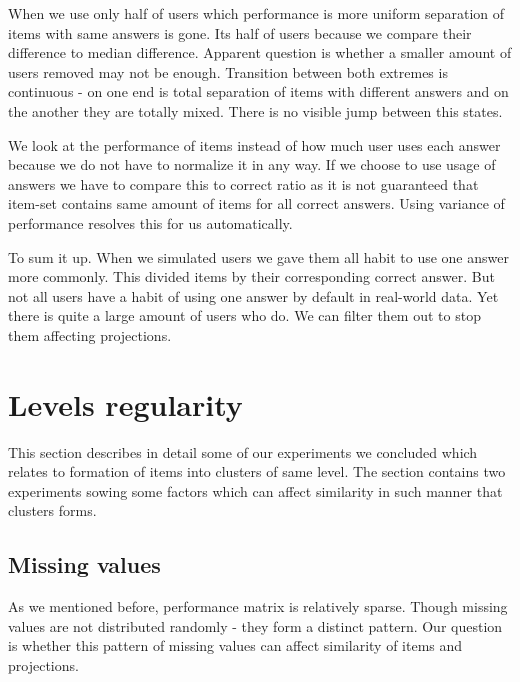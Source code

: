 \documentclass[
  digital, %
  table,   %
  nolof,     %
  nolot,     %
  nocover,
  color
]{fithesis3}
\begin{document}

When we use only half of users which performance is more uniform separation of items with same answers is gone. Its half of users because we compare their difference to median difference. Apparent question is whether a smaller amount of users removed may not be enough. Transition between both extremes is continuous - on one end is total separation of items with different answers and on the another they are totally mixed. There is no visible jump between this states.

We look at the performance of items instead of how much user uses each answer because we do not have to normalize it in any way. If we choose to use usage of answers we have to compare this to correct ratio as it is not guaranteed that item-set contains same amount of items for all correct answers. Using variance of performance resolves this for us automatically.


To sum it up. When we simulated users we gave them all habit to use one answer more commonly. This divided items by their corresponding correct answer. But not all users have a habit of using one answer by default in real-world data. Yet there is quite a large amount of users who do. We can filter them out to stop them affecting projections.


\section{Levels regularity}\label{evaulation-levels-regularity}

This section describes in detail some of our experiments we concluded which relates to formation of items into clusters of same level. The section contains two experiments sowing some factors which can affect similarity in such manner that clusters forms.


\subsection{Missing values}\label{missing-values}


As we mentioned before, performance matrix is relatively sparse. Though missing values are not distributed randomly - they form a distinct pattern. Our question is whether this pattern of missing values can affect similarity of items and projections.
\end{document}
